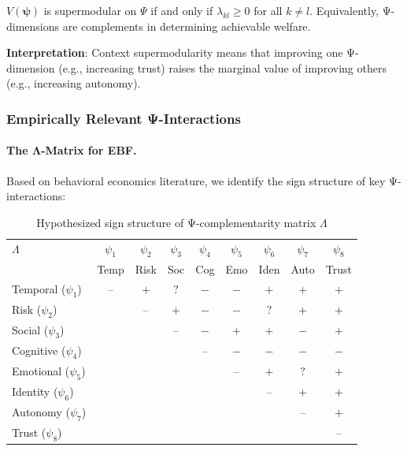 \begin{proposition}
\label{prop:context-super}
$V(\boldsymbol{\psi})$ is supermodular on $\Psi$ if and only if $\lambda_{kl} \geq 0$ 
for all $k \neq l$. Equivalently, Ψ-dimensions are complements in determining 
achievable welfare.
\end{proposition}

\textbf{Interpretation}: Context supermodularity means that improving one Ψ-dimension 
(e.g., increasing trust) raises the marginal value of improving others (e.g., 
increasing autonomy).

\subsubsection{Empirically Relevant Ψ-Interactions}

\paragraph{The Λ-Matrix for EBF.}

Based on behavioral economics literature, we identify the sign structure of key 
Ψ-interactions:

\begin{table}[h]
\centering
\small
\begin{tabular}{l|cccccccc}
\toprule
$\Lambda$ & $\psi_1$ & $\psi_2$ & $\psi_3$ & $\psi_4$ & $\psi_5$ & $\psi_6$ & $\psi_7$ & $\psi_8$ \\
 & Temp & Risk & Soc & Cog & Emo & Iden & Auto & Trust \\
\midrule
Temporal ($\psi_1$) & -- & $+$ & $?$ & $-$ & $-$ & $+$ & $+$ & $+$ \\
Risk ($\psi_2$) & & -- & $+$ & $-$ & $-$ & $?$ & $+$ & $+$ \\
Social ($\psi_3$) & & & -- & $-$ & $+$ & $+$ & $-$ & $+$ \\
Cognitive ($\psi_4$) & & & & -- & $-$ & $-$ & $-$ & $-$ \\
Emotional ($\psi_5$) & & & & & -- & $+$ & $?$ & $+$ \\
Identity ($\psi_6$) & & & & & & -- & $+$ & $+$ \\
Autonomy ($\psi_7$) & & & & & & & -- & $+$ \\
Trust ($\psi_8$) & & & & & & & & -- \\
\bottomrule
\end{tabular}
\caption{Hypothesized sign structure of Ψ-complementarity matrix $\Lambda$}
\label{tab:lambda-matrix}
\end{table}

